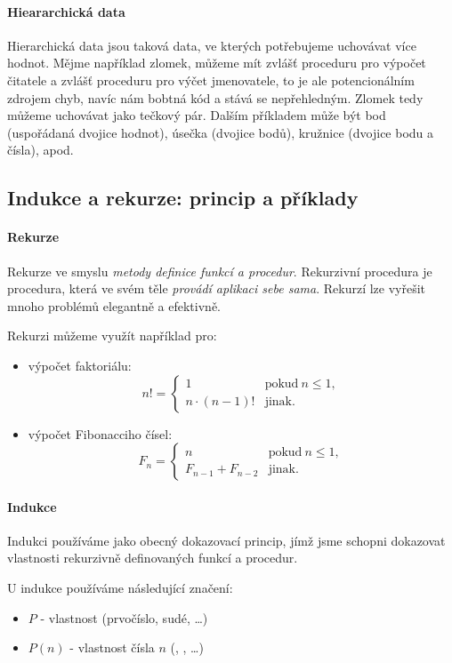 \documentclass[10pt,a4paper]{article}
\begin{document}
    \paragraph{Hieararchická data} Hierarchická data jsou taková data, ve kterých potřebujeme uchovávat více hodnot. Mějme například zlomek, můžeme mít zvlášť proceduru pro výpočet čitatele a zvlášť proceduru pro výčet jmenovatele, to je ale potencionálním zdrojem chyb, navíc nám bobtná kód a stává se nepřehledným. Zlomek tedy můžeme uchovávat jako tečkový pár. Dalším příkladem může být bod (uspořádaná dvojice hodnot), úsečka (dvojice bodů), kružnice (dvojice bodu a čísla), apod.
  \subsection{Indukce a rekurze: princip a příklady}
    \paragraph{Rekurze} Rekurze ve smyslu \textit{metody definice funkcí a procedur}.  Rekurzivní procedura je procedura, která ve svém těle \textit{provádí aplikaci sebe sama}. Rekurzí lze vyřešit mnoho problémů elegantně a efektivně.
    
    Rekurzi můžeme využít například pro:
    \begin{itemize}
      \item výpočet faktoriálu: 
        $$
          n!=
          \begin{cases}
            1 & \text{pokud}\ n\leq 1,\\
            n \cdot (n-1)! & \text{jinak.}
          \end{cases}
        $$
      \item výpočet Fibonacciho čísel:
        $$
          F_n=
          \begin{cases}
            n & \text{pokud}\ n\leq 1,\\
            F_{n-1}+F_{n-2} & \text{jinak.}
          \end{cases}
        $$
    \end{itemize}
    
    \paragraph{Indukce} Indukci používáme jako obecný dokazovací princip, jímž jsme schopni dokazovat vlastnosti rekurzivně definovaných funkcí a procedur.
    
    U indukce používáme následující značení:
    \begin{itemize}
      \item $P$ - vlastnost (prvočíslo, sudé, \dots)
      \item $P(n)$ - vlastnost čísla $n$ (, , \dots)
    \end{itemize}
    
\end{document}
